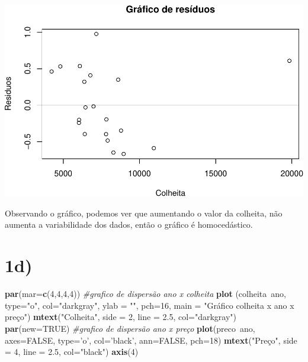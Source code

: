 \documentclass[11pt,]{article}
\makeatletter
\newenvironment{Shaded}{\begin{snugshade}}{\end{snugshade}}
\newcommand{\KeywordTok}[1]{\textcolor[rgb]{0.13,0.29,0.53}{\textbf{{#1}}}}
\newcommand{\DataTypeTok}[1]{\textcolor[rgb]{0.13,0.29,0.53}{{#1}}}
\newcommand{\DecValTok}[1]{\textcolor[rgb]{0.00,0.00,0.81}{{#1}}}
\newcommand{\FloatTok}[1]{\textcolor[rgb]{0.00,0.00,0.81}{{#1}}}
\newcommand{\StringTok}[1]{\textcolor[rgb]{0.31,0.60,0.02}{{#1}}}
\newcommand{\CommentTok}[1]{\textcolor[rgb]{0.56,0.35,0.01}{\textit{{#1}}}}
\newcommand{\OtherTok}[1]{\textcolor[rgb]{0.56,0.35,0.01}{{#1}}}
\newcommand{\NormalTok}[1]{{#1}}
\def\maxwidth{\ifdim\Gin@nat@width>\linewidth\linewidth
\else\Gin@nat@width\fi}
\let\Oldincludegraphics\includegraphics
\renewcommand{\includegraphics}[1]{\Oldincludegraphics[width=\maxwidth]{#1}}
\makeatother
\begin{document}
\includegraphics{versaofinal_lista3_files/figure-latex/unnamed-chunk-5-1.pdf}

Observando o gráfico, podemos ver que aumentando o valor da colheita,
não aumenta a variabilidade dos dados, então o gráfico é homocedástico.

\section{1d)}\label{d}

\begin{Shaded}
\begin{Highlighting}[]
\KeywordTok{par}\NormalTok{(}\DataTypeTok{mar=}\KeywordTok{c}\NormalTok{(}\DecValTok{4}\NormalTok{,}\DecValTok{4}\NormalTok{,}\DecValTok{4}\NormalTok{,}\DecValTok{4}\NormalTok{))}
\CommentTok{#grafico de dispersão ano x colheita}
\KeywordTok{plot} \NormalTok{(colheita~ano, }\DataTypeTok{type=}\StringTok{"o"}\NormalTok{, }\DataTypeTok{col=}\StringTok{"darkgray"}\NormalTok{, }\DataTypeTok{ylab =} \StringTok{""}\NormalTok{, }\DataTypeTok{pch=}\DecValTok{16}\NormalTok{,}
      \DataTypeTok{main =} \StringTok{"Gráfico colheita x ano x preço"}\NormalTok{)}
\KeywordTok{mtext}\NormalTok{(}\StringTok{"Colheita"}\NormalTok{, }\DataTypeTok{side =} \DecValTok{2}\NormalTok{, }\DataTypeTok{line =} \FloatTok{2.5}\NormalTok{, }\DataTypeTok{col=}\StringTok{"darkgray"}\NormalTok{)}
\KeywordTok{par}\NormalTok{(}\DataTypeTok{new=}\OtherTok{TRUE}\NormalTok{)}
\CommentTok{#grafico de dispersão ano x preço}
\KeywordTok{plot}\NormalTok{(preco~ano, }\DataTypeTok{axes=}\OtherTok{FALSE}\NormalTok{, }\DataTypeTok{type=}\StringTok{'o'}\NormalTok{, }\DataTypeTok{col=}\StringTok{'black'}\NormalTok{, }\DataTypeTok{ann=}\OtherTok{FALSE}\NormalTok{, }\DataTypeTok{pch=}\DecValTok{18}\NormalTok{)}
\KeywordTok{mtext}\NormalTok{(}\StringTok{"Preço"}\NormalTok{, }\DataTypeTok{side =} \DecValTok{4}\NormalTok{, }\DataTypeTok{line =} \FloatTok{2.5}\NormalTok{, }\DataTypeTok{col=}\StringTok{"black"}\NormalTok{)}
\KeywordTok{axis}\NormalTok{(}\DecValTok{4}\NormalTok{)}
\end{Highlighting}
\end{Shaded}
\end{document}
